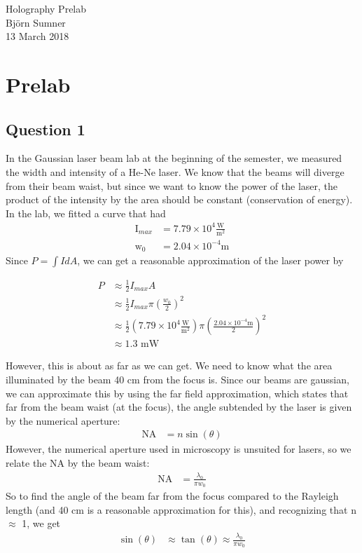 \documentclass[12pt]{article}
\begin{document}
\begin{center}
{\Large Holography Prelab} \\[.3in]
{\large Bj\"{o}rn Sumner} \\
{13 March 2018}
\end{center}

\section*{Prelab}

\subsection*{Question 1}
In the Gaussian laser beam lab at the beginning of the semester, we measured the width and intensity of a He-Ne laser.  We know that the beams will diverge from their beam waist, but since we want to know the power of the laser, the product of the intensity by the area should be constant (conservation of energy).  In the lab, we fitted a curve that had 
\begin{align*}
	\text{I}_{max} &= 7.79 \times 10^4 \frac{\text{W}}{\text{m}^2}\\
	\text{w}_0 &= 2.04 \times 10^{-4} \text{m}
\end{align*}
Since $P=\int I dA$, we can get a reasonable approximation of the laser power by

\begin{align*}
	P &\approx \frac{1}{2}I_{max}A\\
	&\approx \frac{1}{2} I_{max} \pi \left(\frac{w_0}{2}\right)^2\\
	&\approx \frac{1}{2} \left(7.79 \times 10^4 \frac{\text{W}}{\text{m}^2}\right) \pi \left(\frac{2.04 \times 10^{-4} \text{m}}{2}\right)^2\\
	&\approx 1.3 \text{ mW}
\end{align*} 

However, this is about as far as we can get.  We need to know what the area illuminated by the beam 40 cm from the focus is.  Since our beams are gaussian, we can approximate this by using the far field approximation, which states that far from the beam waist (at the focus), the angle subtended by the laser is given by the numerical aperture:
\begin{align*}
	\text{NA} &= n \sin(\theta)
\end{align*}  However, the numerical aperture used in microscopy is unsuited for lasers, so we relate the NA by the beam waist:
\begin{align*}
	\text{NA} &= \frac{\lambda_0}{\pi w_0}
\end{align*} 
So to find the angle of the beam far from the focus compared to the Rayleigh length (and 40 cm is a reasonable approximation for this), and recognizing that n$\approx$ 1, we get 
\begin{align*}
	\sin(\theta) &\approx \tan(\theta) \approx \frac{\lambda_0}{\pi w_0}
\end{align*}
\end{document}
